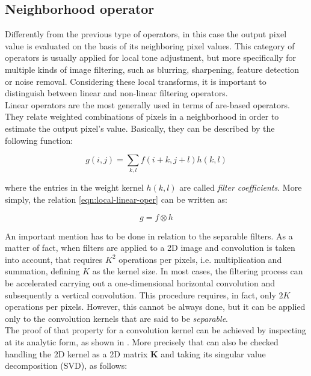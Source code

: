 \subsection{Neighborhood operator}
\label{subsection:neighbor-operator}

Differently from the previous type of operators, in this case the output pixel value is evaluated on the basis of its neighboring pixel values.
This category of operators is usually applied for local tone adjustment, but more specifically for multiple kinds of image filtering, such as blurring, sharpening, feature detection or noise removal.
Considering these local transforms, it is important to distinguish between linear and non-linear filtering operators.\\
Linear operators are the most generally used in terms of are-based operators. 
They relate weighted combinations of pixels in a neighborhood in order to estimate the output pixel's value. 
Basically, they can be described by the following function:

\begin{equation}
 \label{eqn:local-linear-oper}
 g(i, j) = \sum_{k,l} f(i + k, j + l)h(k, l)
\end{equation}

where the entries in the weight kernel $h(k, l)$ are called \textit{filter coefficients}.
More simply, the relation \ref{eqn:local-linear-oper} can be written as:

\begin{equation}
	\label{eqn:compact-loc-lin-op}
	g = f \otimes h
\end{equation}

An important mention has to be done in relation to the separable filters.
As a matter of fact, when filters are applied to a 2D image and convolution is taken into account, that requires $K^2$ operations per pixels, i.e. multiplication and summation, defining $K$ as the kernel size.
In most cases, the filtering process can be accelerated carrying out a one-dimensional horizontal convolution and subsequently a vertical convolution. 
This procedure requires, in fact, only $2K$ operations per pixels.
However, this cannot be always done, but it can be applied only to the convolution kernels that are said to be \textit{separable}. \\
The proof of that property for a convolution kernel can be achieved by inspecting at its analytic form, as shown in \cite{Freeman1991}.
More precisely that can also be checked handling the 2D kernel as a 2D matrix $\mathbf{K}$ and taking its singular value decomposition (SVD), as follows:

